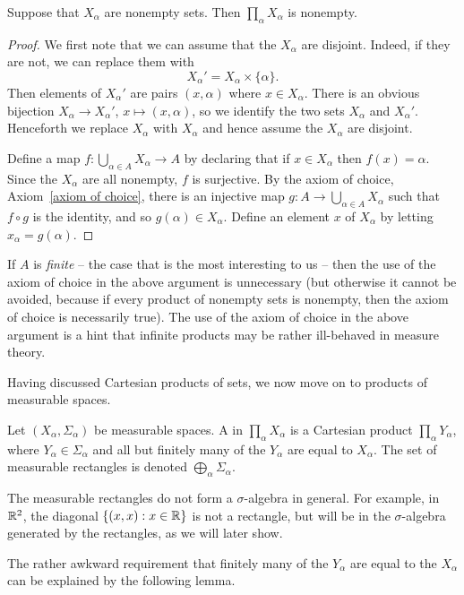 \begin{lemma}
Suppose that $X_\alpha$ are nonempty sets. Then $\prod_{\alpha} X_\alpha$ is nonempty.
\end{lemma}
\begin{proof}
We first note that we can assume that the $X_\alpha$ are disjoint. Indeed, if they are not, we can replace them with
\[X_\alpha' = X_{\alpha} \times \{\alpha\}.\]
Then elements of $X_\alpha'$ are pairs $(x, \alpha)$ where $x \in X_\alpha$.
There is an obvious bijection $X_{\alpha} \to X_\alpha'$, $x \mapsto (x, \alpha)$, so we identify the two sets $X_\alpha$ and $X_\alpha'$.
Henceforth we replace $X_\alpha$ with $X_\alpha$ and hence assume the $X_\alpha$ are disjoint.

Define a map $f: \bigcup_{\alpha \in A} X_{\alpha} \to A$ by declaring that if $x \in X_\alpha$ then $f(x) = \alpha$.
Since the $X_\alpha$ are all nonempty, $f$ is surjective.
By the axiom of choice, Axiom~\ref{axiom of choice}, there is an injective map $g: A \to \bigcup_{\alpha \in A} X_\alpha$ such that $f \circ g$ is the identity, and so $g(\alpha) \in X_\alpha$.
Define an element $x$ of $X_\alpha$ by letting $x_{\alpha} = g(\alpha)$.
\end{proof}
If $A$ is \emph{finite} -- the case that is the most interesting to us -- then the use of the axiom of choice in the above argument is unnecessary (but otherwise it cannot be avoided, because if every product of nonempty sets is nonempty, then the axiom of choice is necessarily true).
The use of the axiom of choice in the above argument is a hint that infinite products may be rather ill-behaved in measure theory.

Having discussed Cartesian products of sets, we now move on to products of measurable spaces.
\begin{definition}
Let $(X_\alpha, \Sigma_\alpha)$ be measurable spaces.
A  in $\prod_{\alpha} X_\alpha$ is a Cartesian product $\prod_{\alpha} Y_\alpha$, where $Y_{\alpha} \in \Sigma_\alpha$ and all but finitely many of the $Y_\alpha$ are equal to $X_\alpha$.
The set of measurable rectangles is denoted $\bigoplus_{\alpha} \Sigma_\alpha$.
\end{definition}

The measurable rectangles do not form a $\sigma$-algebra in general.
For example, in $\mathbb{R}^2$, the diagonal $\{(x, x): x \in \mathbb{R}\}$ is not a rectangle, but will be in the $\sigma$-algebra generated by the rectangles, as we will later show.

The rather awkward requirement that finitely many of the $Y_\alpha$ are equal to the $X_\alpha$ can be explained by the following lemma.

